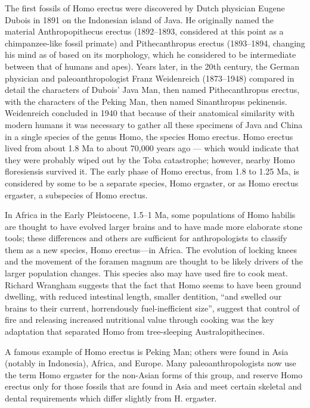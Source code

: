 The first fossils of Homo erectus were discovered by Dutch physician Eugene Dubois in 1891 on the Indonesian island of Java. He originally named the material Anthropopithecus erectus (1892--1893, considered at this point as a chimpanzee-like fossil primate) and Pithecanthropus erectus (1893--1894, changing his mind as of based on its morphology, which he considered to be intermediate between that of humans and apes). Years later, in the 20th century, the German physician and paleoanthropologist Franz Weidenreich (1873--1948) compared in detail the characters of Dubois' Java Man, then named Pithecanthropus erectus, with the characters of the Peking Man, then named Sinanthropus pekinensis. Weidenreich concluded in 1940 that because of their anatomical similarity with modern humans it was necessary to gather all these specimens of Java and China in a single species of the genus Homo, the species Homo erectus. Homo erectus lived from about 1.8 Ma to about 70,000 years ago --- which would indicate that they were probably wiped out by the Toba catastrophe; however, nearby Homo floresiensis survived it. The early phase of Homo erectus, from 1.8 to 1.25 Ma, is considered by some to be a separate species, Homo ergaster, or as Homo erectus ergaster, a subspecies of Homo erectus.

In Africa in the Early Pleistocene, 1.5--1 Ma, some populations of Homo habilis are thought to have evolved larger brains and to have made more elaborate stone tools; these differences and others are sufficient for anthropologists to classify them as a new species, Homo erectus---in Africa. The evolution of locking knees and the movement of the foramen magnum are thought to be likely drivers of the larger population changes. This species also may have used fire to cook meat. Richard Wrangham suggests that the fact that Homo seems to have been ground dwelling, with reduced intestinal length, smaller dentition, ``and swelled our brains to their current, horrendously fuel-inefficient size'', suggest that control of fire and releasing increased nutritional value through cooking was the key adaptation that separated Homo from tree-sleeping Australopithecines.

A famous example of Homo erectus is Peking Man; others were found in Asia (notably in Indonesia), Africa, and Europe. Many paleoanthropologists now use the term Homo ergaster for the non-Asian forms of this group, and reserve Homo erectus only for those fossils that are found in Asia and meet certain skeletal and dental requirements which differ slightly from H. ergaster.


